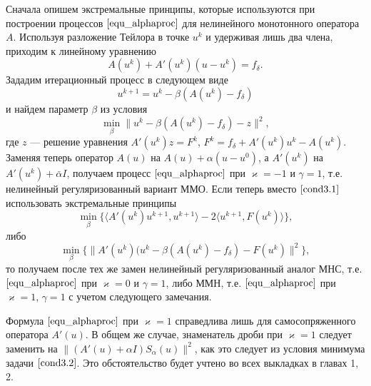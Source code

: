 Сначала опишем экстремальные принципы, которые используются при построении процессов $\eqref{equ_alphaproc}$ для нелинейного монотонного оператора $A$. Используя разложение Тейлора в точке $u^k$ и удерживая лишь два члена, приходим к линейному уравнению
\begin{equation*}
A(u^k)+A'(u^k)(u-u^k)=f_{\delta}.
\end{equation*}
Зададим итерационный процесс в следующем виде
\begin{equation*}
u^{k+1}=u^k-\beta(A(u^k)-f_{\delta})
\end{equation*}
и найдем параметр $\beta$ из условия
\begin{equation}\label{cond3.1}
\min_{\beta}{\|u^k-\beta(A(u^k)-f_{\delta})-z\|^2},
\end{equation}
где $z$ --- решение уравнения $A'(u^k)z=F^k$, $F^k=f_{\delta}+A'(u^k)u^k-A(u^k)$. Заменяя теперь оператор $A(u)$ на $A(u)+\alpha(u-u^0)$, а $A'(u^k)$ на $A'(u^k)+\bar\alpha I$, получаем процесс $\eqref{equ_alphaproc}$ при $\varkappa=-1$ и $\gamma=1$, т.е. нелинейный регуляризованный вариант ММО. Если теперь вместо $\eqref{cond3.1}$ использовать экстремальные принципы
$$\min_{\beta}\{\langle A'(u^k)u^{k+1},u^{k+1}\rangle-2\langle u^{k+1},F(u^k)\rangle\},$$
либо 
\begin{equation}\label{cond3.2}
\min_{\beta}\{\|A'(u^k)(u^k-\beta(A(u^k)-f_{\delta})-F(u^k)\|^2\},
\end{equation}
то получаем после тех же замен нелинейный регуляризованный аналог МНС, т.е. $\eqref{equ_alphaproc}$ при $\varkappa=0$ и $\gamma=1$, либо ММН, т.е. $\eqref{equ_alphaproc}$ при $\varkappa=1$, $\gamma=1$ с учетом следующего замечания.

\begin{remark}
	Формула $\eqref{equ_alphaproc}$ при $\varkappa=1$ справедлива лишь для самосопряженного оператора $A'(u)$. В общем же случае, знаменатель дроби при $\varkappa=1$ следует заменить на $\|(A'(u)+\alpha I)S_\alpha (u)\|^2$, как это следует из условия минимума задачи $\eqref{cond3.2}$. Это обстоятельство будет учтено во всех выкладках в главах 1, 2.
\end{remark}

